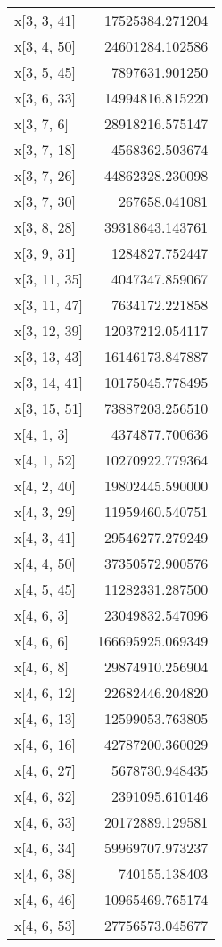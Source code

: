 \begin{longtable}{lr}
x[3, 3, 41] & 17525384.271204 \\
x[3, 4, 50] & 24601284.102586 \\
x[3, 5, 45] & 7897631.901250 \\
x[3, 6, 33] & 14994816.815220 \\
x[3, 7, 6] & 28918216.575147 \\
x[3, 7, 18] & 4568362.503674 \\
x[3, 7, 26] & 44862328.230098 \\
x[3, 7, 30] & 267658.041081 \\
x[3, 8, 28] & 39318643.143761 \\
x[3, 9, 31] & 1284827.752447 \\
x[3, 11, 35] & 4047347.859067 \\
x[3, 11, 47] & 7634172.221858 \\
x[3, 12, 39] & 12037212.054117 \\
x[3, 13, 43] & 16146173.847887 \\
x[3, 14, 41] & 10175045.778495 \\
x[3, 15, 51] & 73887203.256510 \\
x[4, 1, 3] & 4374877.700636 \\
x[4, 1, 52] & 10270922.779364 \\
x[4, 2, 40] & 19802445.590000 \\
x[4, 3, 29] & 11959460.540751 \\
x[4, 3, 41] & 29546277.279249 \\
x[4, 4, 50] & 37350572.900576 \\
x[4, 5, 45] & 11282331.287500 \\
x[4, 6, 3] & 23049832.547096 \\
x[4, 6, 6] & 166695925.069349 \\
x[4, 6, 8] & 29874910.256904 \\
x[4, 6, 12] & 22682446.204820 \\
x[4, 6, 13] & 12599053.763805 \\
x[4, 6, 16] & 42787200.360029 \\
x[4, 6, 27] & 5678730.948435 \\
x[4, 6, 32] & 2391095.610146 \\
x[4, 6, 33] & 20172889.129581 \\
x[4, 6, 34] & 59969707.973237 \\
x[4, 6, 38] & 740155.138403 \\
x[4, 6, 46] & 10965469.765174 \\
x[4, 6, 53] & 27756573.045677 \\

\end{longtable}
